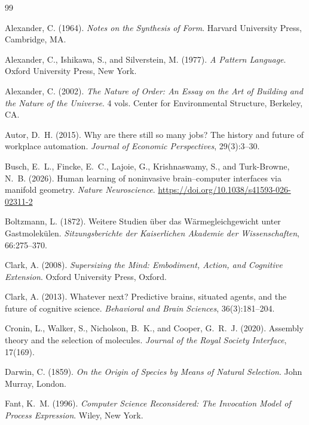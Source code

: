 \documentclass[12pt, a4paper]{article}
\theoremstyle{plain}
\theoremstyle{definition}
\theoremstyle{remark}
\begin{document}
\newpage

\begin{thebibliography}{99}

Alexander, C. (1964). \textit{Notes on the Synthesis of Form}. Harvard
University Press, Cambridge, MA.

Alexander, C., Ishikawa, S., and Silverstein, M. (1977). \textit{A Pattern
Language}. Oxford University Press, New York.

Alexander, C. (2002). \textit{The Nature of Order: An Essay on the Art of
Building and the Nature of the Universe}. 4 vols. Center for Environmental
Structure, Berkeley, CA.

Autor, D.~H. (2015). Why are there still so many jobs? The history and future
of workplace automation. \textit{Journal of Economic Perspectives},
29(3):3--30.

Busch, E.~L., Fincke, E.~C., Lajoie, G., Krishnaswamy, S., and
Turk-Browne, N.~B. (2026). Human learning of noninvasive brain--computer
interfaces via manifold geometry. \textit{Nature Neuroscience}.
\url{https://doi.org/10.1038/s41593-026-02311-2}

Boltzmann, L. (1872). Weitere Studien \"{u}ber das W\"{a}rmegleichgewicht unter
Gastmolek\"{u}len. \textit{Sitzungsberichte der Kaiserlichen Akademie der
Wissenschaften}, 66:275--370.

Clark, A. (2008). \textit{Supersizing the Mind: Embodiment, Action, and
Cognitive Extension}. Oxford University Press, Oxford.

Clark, A. (2013). Whatever next? Predictive brains, situated agents, and
the future of cognitive science. \textit{Behavioral and Brain Sciences},
36(3):181--204.

Cronin, L., Walker, S., Nicholson, B.~K., and Cooper, G.~R.~J. (2020).
Assembly theory and the selection of molecules. \textit{Journal of the
Royal Society Interface}, 17(169).

Darwin, C. (1859). \textit{On the Origin of Species by Means of Natural
Selection}. John Murray, London.

Fant, K.~M. (1996). \textit{Computer Science Reconsidered: The Invocation
Model of Process Expression}. Wiley, New York.


\end{thebibliography}
\end{document}
